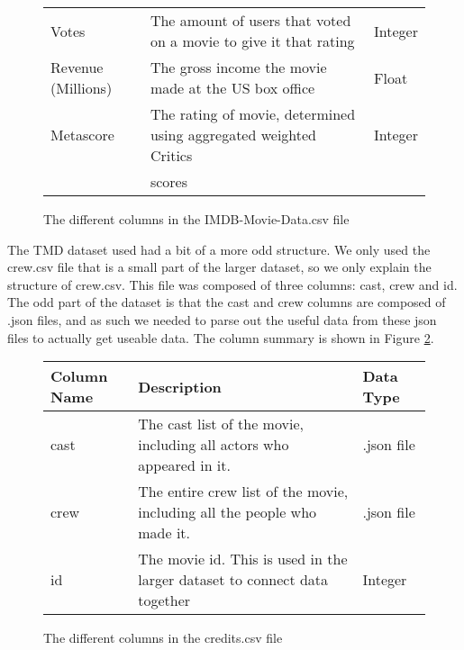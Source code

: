 \begin{figure}[h]
\begin{tabular}[width = \textwidth]{lll}
                Votes   &               The amount of users that voted on a movie to give it that rating            & Integer \\ 
                Revenue (Millions) &    The gross income the movie made at the US box office                        & Float \\  
                Metascore   &           The rating of movie, determined using aggregated weighted Critics           & Integer \\
                {}          &           scores                                                                      & {} \\         
                \bottomrule
            \end{tabular}
            \caption[short]{The different columns in the IMDB-Movie-Data.csv file}\label{fig-IMDB-Movie-Data-Column-Description}
        \end{figure}
        
        The TMD dataset used had a bit of a more odd structure.
        We only used the crew.csv file that is a small part of the larger dataset, so we only explain the structure of crew.csv.
        This file was composed of three columns: cast, crew and id.
        The odd part of the dataset is that the cast and crew columns are composed of .json files, and as such we needed to parse 
            out the useful data from these json files to actually get useable data.
        The column summary is shown in Figure \ref*{fig-Credits-Column-Description}.
        \begin{figure}[h]
            \centering
            \begin{tabular}[width = \textwidth]{lll}
                \toprule
                Column Name &           Description                                                                 & Data Type  \\
                \midrule
                cast &                  The cast list of the movie, including all actors who appeared in it.        & .json file \\          
                crew &                  The entire crew list of the movie, including all the people who made it.    & .json file \\
                id &                    The movie id. This is used in the larger dataset to connect data together   & Integer     \\        
                \bottomrule
            \end{tabular}
            \caption[short]{The different columns in the credits.csv file}\label{fig-Credits-Column-Description}
        \end{figure}

